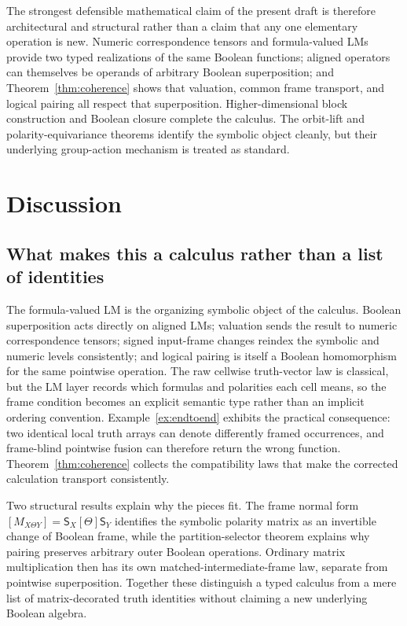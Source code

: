 \documentclass[11pt]{article}
\theoremstyle{definition}
\theoremstyle{remark}
\begin{document}
The strongest defensible mathematical claim of the present draft is therefore architectural and structural rather than a claim that any one elementary operation is new.  Numeric correspondence tensors and formula-valued LMs provide two typed realizations of the same Boolean functions; aligned operators can themselves be operands of arbitrary Boolean superposition; and Theorem~\ref{thm:coherence} shows that valuation, common frame transport, and logical pairing all respect that superposition.  Higher-dimensional block construction and Boolean closure complete the calculus.  The orbit-lift and polarity-equivariance theorems identify the symbolic object cleanly, but their underlying group-action mechanism is treated as standard.

\section{Discussion}

\subsection{What makes this a calculus rather than a list of identities}

The formula-valued LM is the organizing symbolic object of the calculus.  Boolean superposition acts directly on aligned LMs; valuation sends the result to numeric correspondence tensors; signed input-frame changes reindex the symbolic and numeric levels consistently; and logical pairing is itself a Boolean homomorphism for the same pointwise operation.  The raw cellwise truth-vector law is classical, but the LM layer records which formulas and polarities each cell means, so the frame condition becomes an explicit semantic type rather than an implicit ordering convention.  Example~\ref{ex:endtoend} exhibits the practical consequence: two identical local truth arrays can denote differently framed occurrences, and frame-blind pointwise fusion can therefore return the wrong function.  Theorem~\ref{thm:coherence} collects the compatibility laws that make the corrected calculation transport consistently.

Two structural results explain why the pieces fit.  The frame normal form $[M_{X\Theta Y}]=\mathsf S_X[\Theta]\mathsf S_Y$ identifies the symbolic polarity matrix as an invertible change of Boolean frame, while the partition-selector theorem explains why pairing preserves arbitrary outer Boolean operations.  Ordinary matrix multiplication then has its own matched-intermediate-frame law, separate from pointwise superposition.  Together these distinguish a typed calculus from a mere list of matrix-decorated truth identities without claiming a new underlying Boolean algebra.
\end{document}
